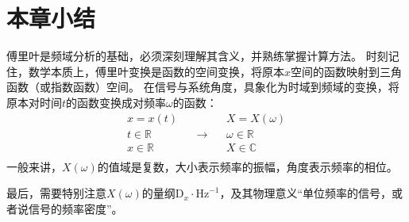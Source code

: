 \section{本章小结}

傅里叶是频域分析的基础，必须深刻理解其含义，并熟练掌握计算方法。
时刻记住，数学本质上，傅里叶变换是函数的空间变换，将原本$x$空间的函数映射到三角函数（或指数函数）空间。
在信号与系统角度，具象化为时域到频域的变换，将原本对时间$t$的函数变换成对频率$\omega $的函数：
\[
\begin{array}{l}
	x=x\left( t \right)\\
	t\in \mathbb{R}\\
	x\in \mathbb{R}\\
\end{array} \quad \rightarrow \quad \begin{array}{l}
	X=X\left( \omega \right)\\
	\omega \in \mathbb{R}\\
	X\in \mathbb{C}\\
\end{array}
\]
一般来讲，$X\left( \omega \right) $的值域是复数，大小表示频率的振幅，角度表示频率的相位。

最后，需要特别注意$X\left( \omega \right) $的量纲$\mathrm{D}_x\cdot \mathrm{Hz}^{-1}$，及其物理意义“单位频率的信号，或者说信号的频率密度”。





